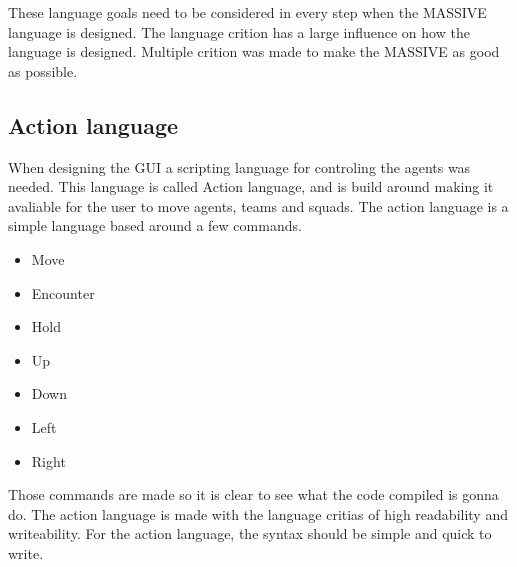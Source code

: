 These language goals need to be considered in every step when the MASSIVE language is designed.
The language crition has a large influence on how the language is designed. Multiple crition was made to make the MASSIVE as good as possible.

\subsection{Action language}
When designing the GUI a scripting language for controling the agents was needed. This language is called Action language, and is build around making it avaliable for the user to move agents, teams and squads.
The action language is a simple language based around a few commands.

\begin{itemize}
	\item Move
	\item Encounter
	\item Hold
	\item Up
	\item Down
	\item Left
	\item Right
\end{itemize}

Those commands are made so it is clear to see what the code compiled is gonna do. The action language is made with the language critias of high readability and writeability. For the action language, the syntax should be simple and quick to write.